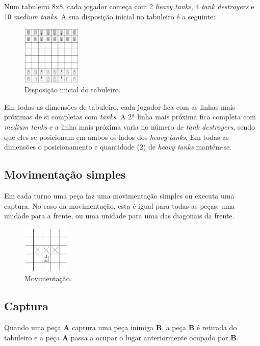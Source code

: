 \documentclass[a4paper,11pt,portuguese]{article}
\begin{document}
\noindent Num tabuleiro 8x8, cada jogador começa com 2 \textit{heavy tanks}, 4 \textit{tank destroyers}
e 10 \textit{medium tanks}. A sua disposição inicial no tabuleiro é a seguinte:

\begin{figure}[H]
    \centering
    \includegraphics[width=0.25\textwidth]{imgs/board.png}
    \caption{Disposição inicial do tabuleiro.}
    \label{fig:board}
\end{figure}

\noindent Em todas as dimensões de tabuleiro, cada jogador fica com as linhas mais próximas de si completas com \textit{tanks}.
A 2ª linha mais próxima fica completa com \textit{medium tanks} e a linha mais próxima varia no número
de \textit{tank destroyers}, sendo que eles se posicionam em ambos os lados dos \textit{heavy tanks}.
Em todas as dimensões o posicionamento e quantidade (2) de \textit{heavy tanks} mantém-se.

\subsection{Movimentação simples}
Em cada turno uma peça faz uma movimentação simples ou executa uma captura. No caso 
da movimentação, esta é igual para todas as peças: uma unidade para a frente, ou uma 
unidade para uma das diagonais da frente.

\begin{figure}[H]
    \centering
    \includegraphics[width=0.2\textwidth]{imgs/movement.png}
    \caption{Movimentação.}
    \label{fig:movemente}
\end{figure}

\subsection{Captura}
Quando uma peça \textbf{A} captura uma peça inimiga \textbf{B}, a peça \textbf{B} é retirada do tabuleiro
e a peça \textbf{A} passa a ocupar o lugar anteriormente ocupado por \textbf{B}. 
\end{document}
